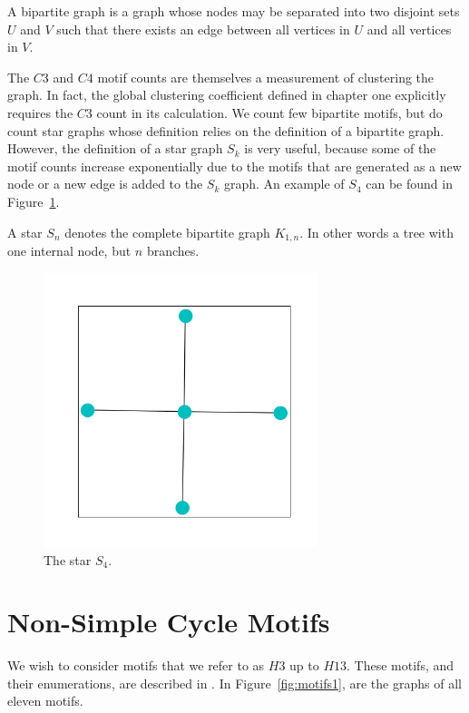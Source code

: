 \begin{dfn}
    A bipartite graph is a graph whose nodes may be separated into two disjoint sets $U$ and $V$
    such that there exists an edge between all vertices in $U$ and all vertices in $V$.
\end{dfn}

The $C3$ and $C4$ motif counts are themselves a measurement of clustering the graph. In fact, the
global clustering coefficient defined in chapter one explicitly requires the $C3$ count in its 
calculation. We count few bipartite motifs, but do count star graphs whose definition relies on the definition of a bipartite graph. However, the definition of a star graph $S_k$ is very useful,
 because some of the motif counts increase exponentially
due to the motifs that are generated as a new node or a new edge is added to the $S_k$ graph. An example of $S_4$ can be found in Figure~\ref{fig:star}.

\begin{dfn}
    A star $S_n$ denotes the complete bipartite graph $K_{1,n}$. In other words 
    a tree with one internal node, but $n$ branches.
\end{dfn}

\begin{figure}[h!]
    \includegraphics[width=8cm]{Images/Star.png}
    \centering
    \caption{The star $S_4$. \label{fig:star}}
\end{figure}


\newpage

\section{Non-Simple Cycle Motifs}
\label{section:Non-simple Motifs}
We wish to consider motifs that we refer to as $H3$ up to $H13$.
These motifs, and their enumerations, are described in \cite{alon}. In Figure~\ref{fig:motifs1},
are the graphs of all eleven motifs.

